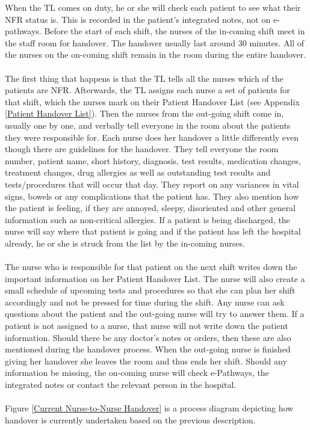 \newpage
\noindent When the TL comes on duty, he or she will check each patient to see what their NFR status is. This is recorded in the patient's integrated notes, not on e-pathways. Before the start of each shift, the nurses of the in-coming shift meet in the staff room for handover. The handover usually last around 30 minutes. All of the nurses on the on-coming shift remain in the room during the entire handover. 
\\ \\ 
The first thing that happens is that the TL tells all the nurses which of the patients are NFR. Afterwards, the TL assigns each nurse a set of patients for that shift, which the nurses mark on their Patient Handover List (see Appendix \ref{Patient Handover List}). Then the nurses from the out-going shift come in, usually one by one, and verbally tell everyone in the room about the patients they were responsible for. Each nurse does her handover a little differently even though there are guidelines for the handover. They tell everyone the room number, patient name, short history, diagnosis, test results, medication changes, treatment changes, drug allergies as well as outstanding test results and tests/procedures that will occur that day. They report on any variances in vital signs, bowels or any complications that the patient has. They also mention how the patient is feeling, if they are annoyed, sleepy, disoriented and other general information such as non-critical allergies. If a patient is being discharged, the nurse will say where that patient is going and if the patient has left the hospital already, he or she is struck from the list by the in-coming nurses. 
\\ \\
The nurse who is responsible for that patient on the next shift writes down the important information on her Patient Handover List. The nurse will also create a small schedule of upcoming tests and procedures so that she can plan her shift accordingly and not be pressed for time during the shift. Any nurse can ask questions about the patient and the out-going nurse will try to answer them. If a patient is not assigned to a nurse, that nurse will not write down the patient information. Should there be any doctor's notes or orders, then these are also mentioned during the handover process. When the out-going nurse is finished giving her handover she leaves the room and thus ends her shift. Should any information be missing, the on-coming nurse will check e-Pathways, the integrated notes or contact the relevant person in the hospital.
\\ \\
Figure \ref{Current Nurse-to-Nurse Handover} is a process diagram depicting how handover is currently undertaken based on the previous description.

